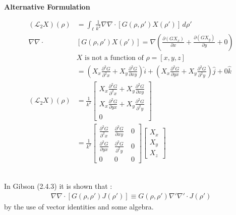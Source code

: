 \documentclass{article}
\newcommand{\0}{\varnothing}
\begin{document}
\begin{minipage}{0.45\textwidth}
\ \\
\begin{center}  \bf Alternative Formulation \end{center}
\begin{align*}
    (\mathcal{L}_2 X)(\rho) &= \int_{\ell}\frac{1}{k^2}\nabla\nabla\cdotp [G(\rho,\rho')X(\rho')] \,d\rho'\\
       \nabla\nabla\cdotp &[G(\rho,\rho')X(\rho')] = \nabla \left(\frac{\partial (G X_x)}{\partial x} + \frac{\partial (G X_y)}{\partial y} + 0\right)\\
       &\text{$X$ is not a function of $\rho = [x,y,z]$}\\
    &= \left( X_x \frac{\partial^2 G}{\partial^2 x} + X_y \frac{\partial^2 G}{\partial xy}\right) \hat i + 
    \left( X_x \frac{\partial^2 G}{\partial yx} + X_y \frac{\partial^2 G}{\partial^2 y}\right) \hat j + 
        0 \hat k\\
    (\mathcal{L}_2X)(\rho) &= \frac{1}{k^2}
    \left[ \begin{array}{c} X_x \frac{\partial^2 G}{\partial^2 x} + X_y\frac{\partial^2 G}{\partial xy} \\ 
                            X_x \frac{\partial^2 G}{\partial yx} + X_y \frac{\partial^2 G}{\partial^2 y}\\ 
                            0 
    \end{array} \right] \\
    &= \frac{1}{k^2} \left[ \begin{array}{ccc} \frac{\partial^2 G }{\partial^2 x} & \frac{\partial^2 G }{\partial xy}\ & 0 \\ 
                            \frac{\partial^2 G}{\partial yx} & \frac{\partial^2 G}{\partial^2 y} &0\\ 
                            0 & 0 &0 \end{array} \right]
        \left[ \begin{array}{c} 
        X_x \\ X_y \\ X_z \end{array} \right]
\end{align*}
\end{minipage}
\ \\

In Gibson (2.4.3) it is shown that \cite{Method_Moments}:
\begin{align*}
    \nabla\nabla\cdotp [G(\rho,\rho')J(\rho')]  \equiv G(\rho,\rho')\nabla'\nabla'\cdotp J(\rho') 
\end{align*}
by the use of vector identities and some algebra.
\end{document}
